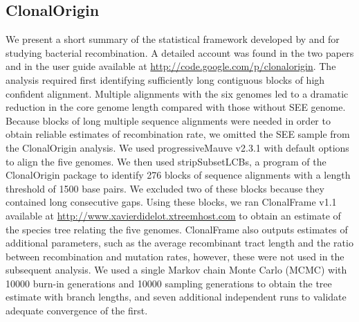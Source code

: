 \documentclass[english]{article}
\begin{document}
\subsection{ClonalOrigin}
We present a short summary of the statistical framework developed by
\citet{Didelot2007} and \citet{Didelot2010} for studying bacterial 
recombination. A detailed account was found in the two papers and in the user 
guide available at \url{http://code.google.com/p/clonalorigin}. 
The analysis required first identifying sufficiently long contiguous blocks of 
high confident alignment. Multiple alignments with the six genomes
led to a dramatic reduction in the core 
genome length compared with those without SEE genome.
Because blocks of long multiple sequence alignments
were needed in order to obtain reliable 
estimates of recombination rate, we omitted the SEE sample 
from the ClonalOrigin analysis. We used progressiveMauve v2.3.1 
\citep{Darling2004,Darling2010} with default options
to align the five genomes.
We then used stripSubsetLCBs, a program of the ClonalOrigin package
to identify 276 blocks of sequence alignments with a length threshold of 
1500 base pairs.  We excluded two of these
blocks because they contained long consecutive gaps. Using these blocks, we ran 
ClonalFrame v1.1 available at
\url{http://www.xavierdidelot.xtreemhost.com} to obtain an 
estimate of the species tree relating the five genomes. ClonalFrame also 
outputs estimates of additional parameters, such as the average recombinant 
tract length and the ratio between recombination and mutation rates, however, 
these were not used in the subsequent analysis. We used a single Markov chain 
Monte Carlo (MCMC) with 10000 burn-in generations and 10000 sampling 
generations to obtain the tree estimate with branch lengths, 
and seven additional independent runs to validate adequate 
convergence of the first.
\end{document}
